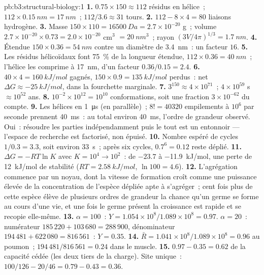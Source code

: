 \begin{solution}{pb:b3:structural-biology:1}
\textbf{1.} $0.75\times 150 \approx 112$ résidus en hélice~; $112\times
\qty{0.15}{nm} = \qty{17}{nm}$~; $112/3.6 \approx 31$ tours.
\textbf{2.} $112 - 8\times 4 = 80$ liaisons hydrogène.
\textbf{3.} Masse $150\times 110 = \qty{16500}{Da} = 2.7\times 10^{-20}$
g~; volume $2.7\times 10^{-20}\times 0.73 = 2.0\times 10^{-20}$ cm$^{3}$
$= \qty{20}{nm^3}$~; rayon $(3V/4\pi)^{1/3} = \qty{1.7}{nm}$.
\textbf{4.} Étendue $150\times 0.36 = \qty{54}{nm}$ contre un diamètre
de \qty{3.4}{nm}~: un facteur $16$.
\textbf{5.} Les résidus hélicoïdaux font \qty{75}{\%} de la longueur
étendue, $112\times 0.36 = \qty{40}{nm}$~; l'hélice les comprime à
\qty{17}{nm}, d'un facteur $0.36/0.15 = 2.4$.
\textbf{6.} $40\times 4 = \qty{160}{kJ/mol}$ gagnés, $150\times 0.9 =
\qty{135}{kJ/mol}$ perdus~: net $\Delta G \approx \qty{-25}{kJ/mol}$,
dans la fourchette marginale.
\textbf{7.} $3^{150} \approx 4\times 10^{71}$~; $4\times 10^{59}$ s
$\approx 10^{52}$ ans.
\textbf{8.} $10^{-2}\times 10^{12} = 10^{10}$ conformations, soit une
fraction $3\times 10^{-62}$ du compte.
\textbf{9.} Les hélices en \qty{1}{\micro s} (en parallèle)~;
$8! = \num{40320}$ empilements à $10^{6}$ par seconde prennent
\qty{40}{ms}~: au total environ \qty{40}{ms}, l'ordre de grandeur
observé. Oui~: résoudre les parties indépendamment puis le tout est un
entonnoir --- l'espace de recherche est factorisé, non épuisé.
\textbf{10.} Nombre espéré de cycles $1/0.3 = 3.3$, soit environ
\qty{33}{s}~; après six cycles, $0.7^{6} = 0.12$ reste déplié.
\textbf{11.} $\Delta G = -RT\ln K$ avec $K = 10^{4} \to 10^{2}$~: de
$-23.7$ à \qty{-11.9}{kJ/mol}, une perte de \qty{12}{kJ/mol} de
stabilité ($RT = \qty{2.58}{kJ/mol}$, $\ln 100 = 4.6$).
\textbf{12.} L'agrégation commence par un noyau, dont la vitesse de
formation croît comme une puissance élevée de la concentration de
l'espèce dépliée apte à s'agréger~; cent fois plus de cette espèce
élève de plusieurs ordres de grandeur la chance qu'un germe se forme au
cours d'une vie, et une fois le germe présent la croissance est rapide
et se recopie elle-même.
\textbf{13.} $\alpha = 100$~: $Y = 1.054\times 10^{8}/1.089\times 10^{8} =
0.97$. $\alpha = 20$~: numérateur $185\,220 + 103\,680 = 288\,900$,
dénominateur $194\,481 + 622\,080 = 816\,561$~: $Y = 0.35$.
\textbf{14.} $\bar R = 1.041\times 10^{8}/1.089\times 10^{8} = 0.96$ au
poumon~; $194\,481/816\,561 = 0.24$ dans le muscle.
\textbf{15.} $0.97 - 0.35 = 0.62$ de la capacité cédée (les deux tiers
de la charge). Site unique~: $100/126 - 20/46 = 0.79 - 0.43 = 0.36$.

\end{solution}
